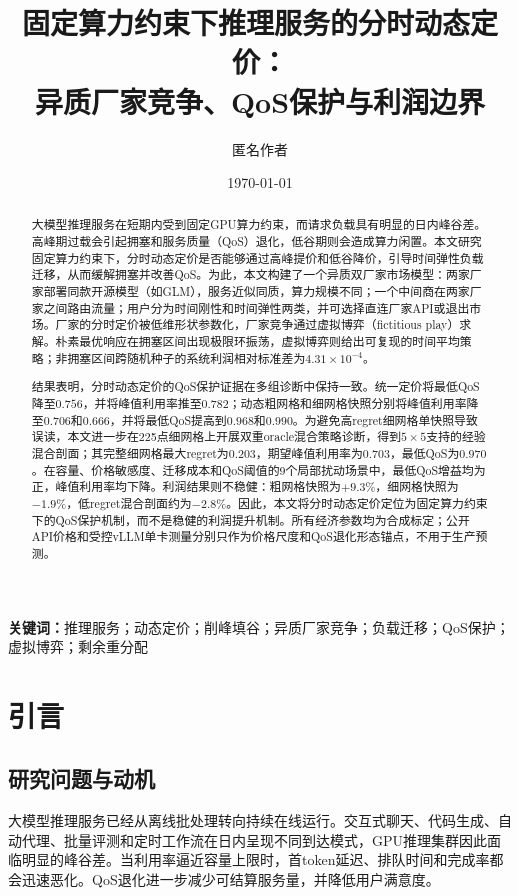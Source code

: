 \documentclass[UTF8,11pt]{ctexart}
\title{\textbf{固定算力约束下推理服务的分时动态定价：\\
异质厂家竞争、QoS保护与利润边界}}
\author{匿名作者}
\date{\today}
\begin{document}
\maketitle

\begin{abstract}
大模型推理服务在短期内受到固定GPU算力约束，而请求负载具有明显的日内峰谷差。高峰期过载会引起拥塞和服务质量（QoS）退化，低谷期则会造成算力闲置。本文研究固定算力约束下，分时动态定价是否能够通过高峰提价和低谷降价，引导时间弹性负载迁移，从而缓解拥塞并改善QoS。为此，本文构建了一个异质双厂家市场模型：两家厂家部署同款开源模型（如GLM），服务近似同质，算力规模不同；一个中间商在两家厂家之间路由流量；用户分为时间刚性和时间弹性两类，并可选择直连厂家API或退出市场。厂家的分时定价被低维形状参数化，厂家竞争通过虚拟博弈（fictitious play）求解。朴素最优响应在拥塞区间出现极限环振荡，虚拟博弈则给出可复现的时间平均策略；非拥塞区间跨随机种子的系统利润相对标准差为$4.31\times10^{-4}$。

结果表明，分时动态定价的QoS保护证据在多组诊断中保持一致。统一定价将最低QoS降至$0.756$，并将峰值利用率推至$0.782$；动态粗网格和细网格快照分别将峰值利用率降至$0.706$和$0.666$，并将最低QoS提高到$0.968$和$0.990$。为避免高regret细网格单快照导致误读，本文进一步在225点细网格上开展双重oracle混合策略诊断，得到$5\times5$支持的经验混合剖面；其完整细网格最大regret为$0.203$，期望峰值利用率为$0.703$，最低QoS为$0.970$。在容量、价格敏感度、迁移成本和QoS阈值的9个局部扰动场景中，最低QoS增益均为正，峰值利用率均下降。利润结果则不稳健：粗网格快照为$+9.3\%$，细网格快照为$-1.9\%$，低regret混合剖面约为$-2.8\%$。因此，本文将分时动态定价定位为固定算力约束下的QoS保护机制，而不是稳健的利润提升机制。所有经济参数均为合成标定；公开API价格和受控vLLM单卡测量分别只作为价格尺度和QoS退化形态锚点，不用于生产预测。
\end{abstract}

\noindent\textbf{关键词：}推理服务；动态定价；削峰填谷；异质厂家竞争；负载迁移；QoS保护；虚拟博弈；剩余重分配

\section{引言}

\subsection{研究问题与动机}

大模型推理服务已经从离线批处理转向持续在线运行。交互式聊天、代码生成、自动代理、批量评测和定时工作流在日内呈现不同到达模式，GPU推理集群因此面临明显的峰谷差\cite{crankshaw2017clipper,gujarati2020clockwork,yu2022orca,kwon2023pagedattention,agrawal2024sarathiserve}。当利用率逼近容量上限时，首token延迟、排队时间和完成率都会迅速恶化。QoS退化进一步减少可结算服务量，并降低用户满意度。
\end{document}
